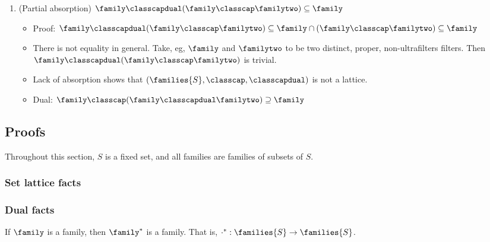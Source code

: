 \begin{enumerate}
\begin{itemize}
        \item {}
    \end{itemize}

    \item (Partial absorption) $\family \classcapdual (\family \classcap \familytwo) \subseteq \family$
    \begin{itemize}
        \item Proof: $\family \classcapdual (\family \classcap \familytwo) \subseteq \family \cap (\family \classcap \familytwo) \subseteq \family$

        \item There is not equality in general.  Take, eg, $\family$ and $\familytwo$ to be two distinct, proper, non-ultrafilters filters.  Then $\family \classcapdual (\family \classcap \familytwo)$ is trivial.

        \item Lack of absorption shows that $(\families{S}, \classcap, \classcapdual)$ is not a lattice.

        \item Dual: $\family \classcap (\family \classcapdual \familytwo) \supseteq \family$
    \end{itemize}
\end{enumerate}

\subsection{Proofs}

Throughout this section, $S$ is a fixed set, and all families are families of subsets of $S$.

\subsubsection{Set lattice facts}


\subsubsection{Dual facts}

\begin{theorem}
    \label{thm_dual_of_fam_is_fam}
    If $\family$ is a family, then $\family^*$ is a family.  That is, $\cdot^*: \families{S} \to \families{S}$.
\end{theorem}


